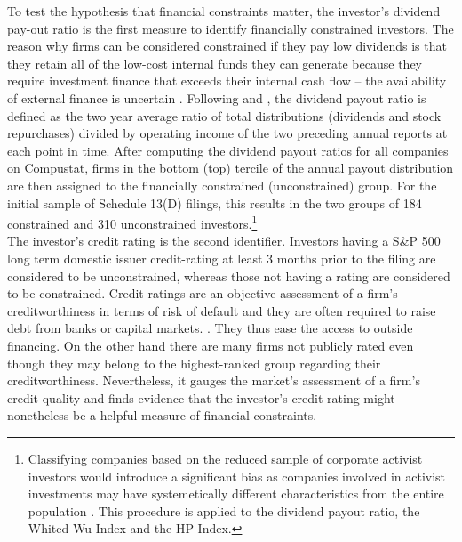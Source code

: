 \documentclass[12pt]{article}
\begin{document}
To test the hypothesis that financial constraints matter, the investor's dividend pay-out ratio is the first measure to identify financially constrained investors. The reason why firms can be considered constrained if they pay low dividends is that they retain all of the low-cost internal funds they can generate because they require investment finance that exceeds their internal cash flow  -- the availability of external finance is uncertain \citep[p.158]{Fazzari1988}. Following \citet{Almeida2004} and \citet[p.119]{Khatami2014}, the dividend payout ratio is defined as the two year average ratio of total distributions (dividends and stock repurchases) divided by operating income of the two preceding annual reports at each point in time. After computing the dividend payout ratios for all companies on Compustat, firms in the bottom (top) tercile of the annual payout distribution are then assigned to the financially constrained (unconstrained) group. For the initial sample of Schedule 13(D) filings, this results in the two groups of 184 constrained and 310 unconstrained investors.\footnote{Classifying companies based on the reduced sample of corporate activist investors would introduce a significant bias as companies involved in activist investments may have systemetically different characteristics from the entire population \citep[p.109]{Khatami2014}. This procedure is applied to the dividend payout ratio, the Whited-Wu Index and the HP-Index.}\\
The investor's credit rating is the second identifier. Investors having a S\&P 500 long term domestic issuer credit-rating at least 3 months prior to the filing are considered to be unconstrained, whereas those not having a rating are considered to be constrained. Credit ratings are an objective assessment of a firm's creditworthiness in terms of risk of default and they are often required to raise debt from banks or capital markets. \citep[p.18]{heller2015}. They thus ease the access to outside financing. On the other hand there are many firms not publicly rated even though they may belong to the highest-ranked group regarding their creditworthiness. Nevertheless, it gauges the market's assessment of a firm's credit quality \citep[p.1790]{Almeida2004} and \citet[p.175]{heller2015} finds evidence that the investor's credit rating might nonetheless be a helpful measure of financial constraints.
\end{document}
